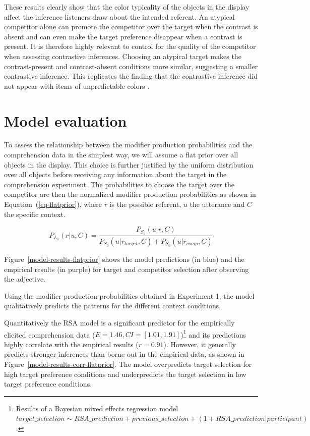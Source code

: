 \documentclass[10pt,letterpaper]{article}
\begin{document}
These results clearly show that the color typicality of the objects in the display affect the inference listeners draw about the intended referent. An atypical competitor alone can promote the competitor over the target when the contrast is absent and can even make the target preference disappear when a contrast is present. It is therefore highly relevant to control for the quality of the competitor when assessing contrastive inferences. 
Choosing an atypical target makes the contrast-present and contrast-absent conditions more similar, suggesting a smaller contrastive inference. This replicates the finding that the contrastive inference did not appear with items of unpredictable colors \cite{Sedivy:2003}.

\section{Model evaluation}

To assess the relationship between the modifier production probabilities and the comprehension data in the simplest way, we will assume a flat prior over all objects in the display. This choice is further justified by the uniform distribution over all objects before receiving any information about the target in the comprehension experiment. The probabilities to choose the target over the competitor are then the normalized modifier production probabilities as shown in Equation~(\ref{eq-flatprior}), where $r$ is the possible referent, $u$ the utterance and $C$ the specific context.

\begin{equation}
	P_{L_1}(r|u,C) = \frac{P_{S_0}(u|r,C)}{P_{S_0}(u|r_{target},C) + P_{S_0}(u|r_{comp},C)}
\label{eq-flatprior}
\end{equation}

Figure~\ref{model-results-flatprior} shows the model predictions (in blue) and the empirical results (in purple) for target and competitor selection after observing the adjective. 

Using the modifier production probabilities obtained in Experiment 1, the model qualitatively predicts the patterns for the different context conditions. 

Quantitatively the RSA model is a significant predictor for the empirically elicited comprehension data ($E=1.46, CI=[1.01, 1.91]$)\footnote{Results of a Bayesian mixed effects regression model $target\_selection \sim RSA\_prediction + previous\_selection + (1+RSA\_prediction|participant)$.} and its predictions highly correlate with the empirical results ($r=0.91$). However, it generally predicts stronger inferences than borne out in the empirical data, as shown in Figure~\ref{model-results-corr-flatprior}. The model overpredicts target selection for high target preference conditions and underpredicts the target selection in low target preference conditions. 
\end{document}
